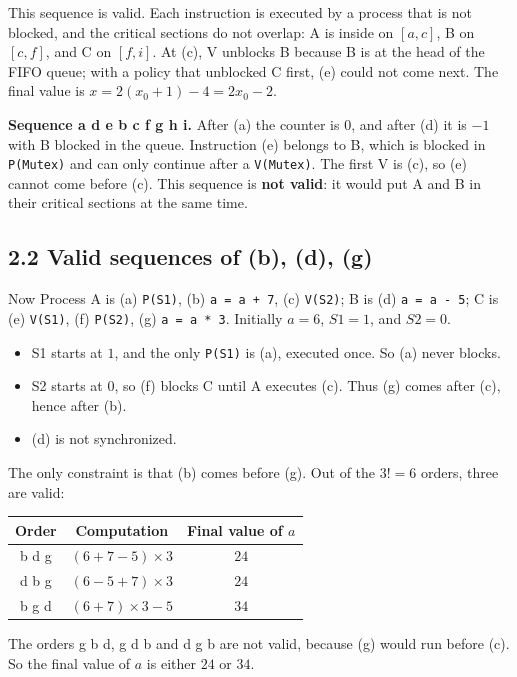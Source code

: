 \documentclass[letterpaper, 11pt]{article}
\newcommand{\1}{\mathds{1}}	%
\theoremstyle{definition}
\begin{document}
This sequence is valid. Each instruction is executed by a process that is not blocked, and the critical sections do not overlap: A is inside on $[a, c]$, B on $[c, f]$, and C on $[f, i]$. At (c), V unblocks B because B is at the head of the FIFO queue; with a policy that unblocked C first, (e) could not come next. The final value is $x = 2(x_0 + 1) - 4 = 2x_0 - 2$.

\textbf{Sequence a d e b c f g h i.} After (a) the counter is $0$, and after (d) it is $-1$ with B blocked in the queue. Instruction (e) belongs to B, which is blocked in \texttt{P(Mutex)} and can only continue after a \texttt{V(Mutex)}. The first V is (c), so (e) cannot come before (c). This sequence is \textbf{not valid}: it would put A and B in their critical sections at the same time.

\subsection*{2.2 Valid sequences of (b), (d), (g)}

Now Process A is (a) \texttt{P(S1)}, (b) \texttt{a = a + 7}, (c) \texttt{V(S2)}; B is (d) \texttt{a = a - 5}; C is (e) \texttt{V(S1)}, (f) \texttt{P(S2)}, (g) \texttt{a = a * 3}. Initially $a = 6$, $S1 = 1$, and $S2 = 0$.
\begin{itemize}
  \item S1 starts at $1$, and the only \texttt{P(S1)} is (a), executed once. So (a) never blocks.
  \item S2 starts at $0$, so (f) blocks C until A executes (c). Thus (g) comes after (c), hence after (b).
  \item (d) is not synchronized.
\end{itemize}
The only constraint is that (b) comes before (g). Out of the $3! = 6$ orders, three are valid:

\begin{center}
\begin{tabular}{ccc}
\toprule
Order & Computation & Final value of $a$ \\
\midrule
b d g & $(6 + 7 - 5) \times 3$ & $24$ \\
d b g & $(6 - 5 + 7) \times 3$ & $24$ \\
b g d & $(6 + 7) \times 3 - 5$ & $34$ \\
\bottomrule
\end{tabular}
\end{center}

The orders g b d, g d b and d g b are not valid, because (g) would run before (c). So the final value of $a$ is either $24$ or $34$.
\end{document}
